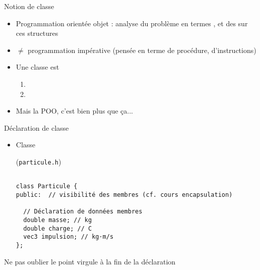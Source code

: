 \documentclass[c]{beamer}
\begin{document}
\begin{frame}[fragile]{Notion de classe}

\begin{itemize}[<+->]
\item Programmation orientée objet : analyse du problème en termes , et des  sur ces structures

\item \(\neq\) programmation impérative (pensée en terme de procédure, d'instructions)

\item Une classe est

\begin{enumerate}
\item {}

\item {}
\end{enumerate}

\item Mais la POO, c'est bien plus que ça...
\end{itemize}

\end{frame}


\begin{frame}[fragile]{Déclaration de classe}

\begin{itemize}
\item Classe 
\begin{cbox}[][lwuc](\texttt{particule.h})
\begin{verbatim}

class Particule {
public:  // visibilité des membres (cf. cours encapsulation)

  // Déclaration de données membres
  double masse; // kg
  double charge; // C
  vec3 impulsion; // kg·m/s
};
\end{verbatim}
\end{cbox}
\end{itemize}

\pause

\begin{cbox}[][][\centering]
 Ne pas oublier le point virgule à la fin de la déclaration
\end{cbox}

\end{frame}
\end{document}
